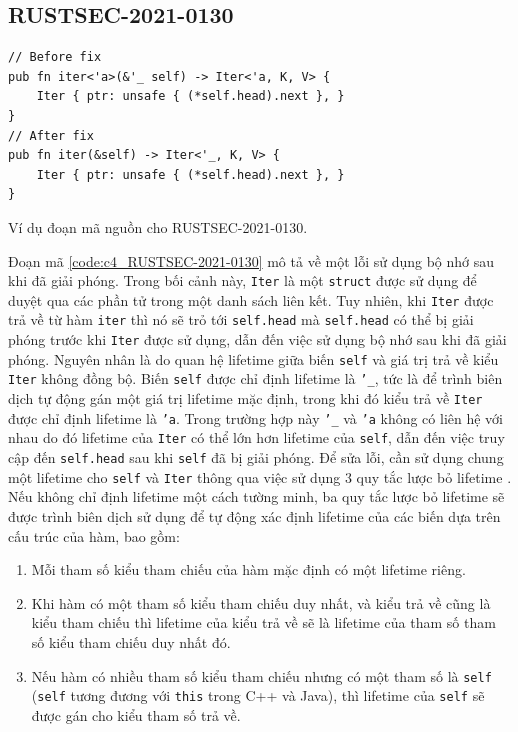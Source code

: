 \subsection{RUSTSEC-2021-0130}

\begin{listing}[H]
\begin{verbatim}
// Before fix
pub fn iter<'a>(&'_ self) -> Iter<'a, K, V> {
    Iter { ptr: unsafe { (*self.head).next }, }
}
// After fix
pub fn iter(&self) -> Iter<'_, K, V> {
    Iter { ptr: unsafe { (*self.head).next }, }
}
\end{verbatim}
\caption{Ví dụ đoạn mã nguồn cho RUSTSEC-2021-0130.}
\label{code:c4_RUSTSEC-2021-0130}
\end{listing}

Đoạn mã \ref{code:c4_RUSTSEC-2021-0130} mô tả về một lỗi sử dụng bộ nhớ sau khi đã giải phóng.
Trong bối cảnh này, \texttt{Iter} là một \texttt{struct} được sử dụng để duyệt qua các phần tử trong một danh sách liên kết.
Tuy nhiên, khi \texttt{Iter} được trả về từ hàm \texttt{iter} thì nó sẽ trỏ tới \texttt{self.head} mà \texttt{self.head} có thể bị giải phóng trước khi \texttt{Iter} được sử dụng, dẫn đến việc sử dụng bộ nhớ sau khi đã giải phóng.
Nguyên nhân là do quan hệ lifetime giữa biến \texttt{self} và giá trị trả về kiểu \texttt{Iter} không đồng bộ.
Biến \texttt{self} được chỉ định lifetime là \texttt{'\_}, tức là để trình biên dịch tự động gán một giá trị lifetime mặc định, trong khi đó kiểu trả về \texttt{Iter} được chỉ định lifetime là \texttt{'a}.
Trong trường hợp này \texttt{'\_} và \texttt{'a} không có liên hệ với nhau do đó lifetime của \texttt{Iter} có thể lớn hơn lifetime của \texttt{self}, dẫn đến việc truy cập đến \texttt{self.head} sau khi \texttt{self} đã bị giải phóng.
Để sửa lỗi, cần sử dụng chung một lifetime cho \texttt{self} và \texttt{Iter} thông qua việc sử dụng 3 quy tắc lược bỏ lifetime \cite{rustlangLifetimeElision}.
Nếu không chỉ định lifetime một cách tường minh, ba quy tắc lược bỏ lifetime sẽ được trình biên dịch sử dụng để tự động xác định lifetime của các biến dựa trên cấu trúc của hàm, bao gồm:

\begin{enumerate}
    \item Mỗi tham số kiểu tham chiếu của hàm mặc định có một lifetime riêng.
    \item Khi hàm có một tham số kiểu tham chiếu duy nhất, và kiểu trả về cũng là kiểu tham chiếu thì lifetime của kiểu trả về sẽ là lifetime của tham số tham số kiểu tham chiếu duy nhất đó.
    \item Nếu hàm có nhiều tham số kiểu tham chiếu nhưng có một tham số là \texttt{self} (\texttt{self} tương đương với \texttt{this} trong C++ và Java), thì lifetime của \texttt{self} sẽ được gán cho kiểu tham số trả về.
\end{enumerate}

